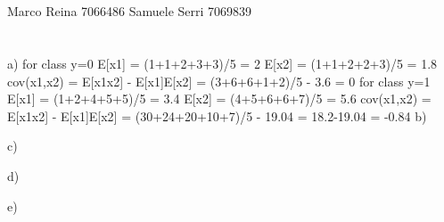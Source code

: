 \documentclass[12pt]{article}
\begin{document}
\section*{}
Marco Reina 7066486 \newline
Samuele Serri 7069839 \newline
\section*{}

a)
for class y=0
E[x1] = (1+1+2+3+3)/5 = 2
E[x2] = (1+1+2+2+3)/5 = 1.8
cov(x1,x2) = E[x1x2] - E[x1]E[x2] = (3+6+6+1+2)/5 - 3.6 = 0
for class y=1
E[x1] = (1+2+4+5+5)/5 = 3.4
E[x2] = (4+5+6+6+7)/5 = 5.6
cov(x1,x2) = E[x1x2] - E[x1]E[x2] = (30+24+20+10+7)/5 - 19.04 = 18.2-19.04 = -0.84
b)


c)


d)


e)
\end{document}

